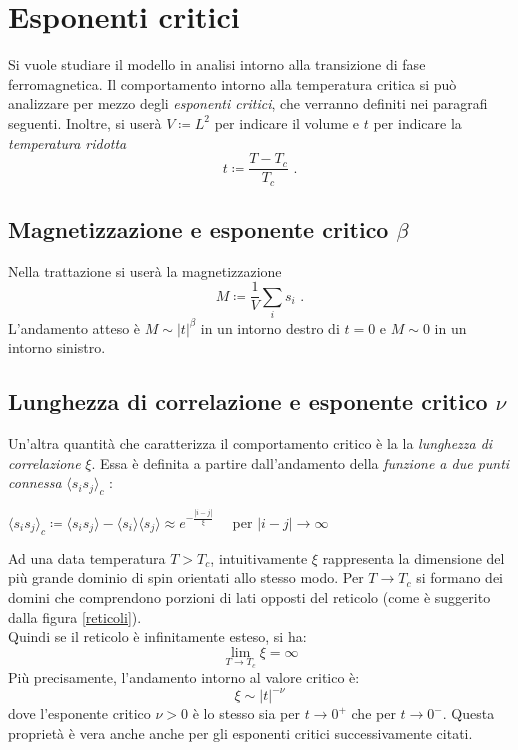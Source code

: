 \documentclass[10pt,a4paper]{article}
\begin{document}
\newpage
\section{Esponenti critici}
Si vuole studiare il modello in analisi intorno alla transizione di fase ferromagnetica. Il comportamento intorno alla temperatura critica si può analizzare per mezzo degli \emph{esponenti critici}, che verranno definiti nei paragrafi seguenti. Inoltre, si userà $V\coloneqq L^2$ per indicare il volume e $t$ per indicare la \emph{temperatura ridotta} $$t \coloneqq\frac{T-T_c}{T_c}\text{ .}$$
\subsection*{Magnetizzazione e esponente critico $\beta$}
Nella trattazione si userà la magnetizzazione $$M\coloneqq\frac{1}{V}\sum_{i}s_i\text{ .}$$ L'andamento atteso è $M \sim |t|^{\beta}$ in un intorno destro di $t=0$ e $M\sim 0$ in un intorno sinistro. 

\subsection*{Lunghezza di correlazione e esponente critico $\nu$}
Un'altra quantità che caratterizza il comportamento critico è la  la \emph{lunghezza di correlazione} $\xi$. Essa è definita a partire dall'andamento della \emph{funzione a due punti connessa} $\langle s_is_j\rangle_c$ :
\begin{center}
$\langle s_is_j\rangle_c \coloneqq \langle s_is_j\rangle-\langle s_i\rangle\langle s_j\rangle\approx e^{-\frac{|i-j|}{\xi}}\quad$ per $|i-j|\rightarrow\infty$
\end{center}
Ad una data temperatura $T>T_c$, intuitivamente $\xi$ rappresenta la dimensione del più grande dominio di spin orientati allo stesso modo. Per $T\rightarrow T_c$ si formano dei domini che comprendono porzioni di lati opposti del reticolo (come è suggerito dalla figura \ref{reticoli}).\\ Quindi se il reticolo è infinitamente esteso, si ha: 
$$\lim_{T\to T_c}\xi=\infty$$
Più precisamente, l'andamento intorno al valore critico è:
\begin{equation}\label{eq:lunghezzadicor}
	\xi \sim |t|^{-\nu}
\end{equation}
dove l'esponente critico $\nu>0$ è lo stesso sia per $t\rightarrow 0^+$ che per $t\rightarrow 0^-$. Questa proprietà è vera anche anche per gli esponenti critici successivamente citati.
\end{document}
